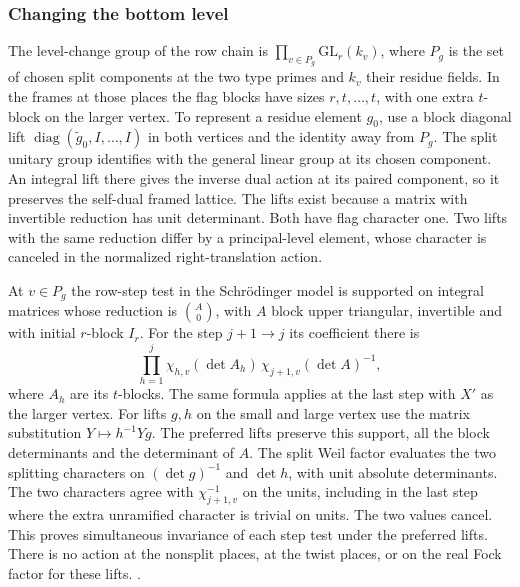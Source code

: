 \subsubsection{Changing the bottom level}
The level-change group of the row chain is
\(\prod_{v\in P_g}\mathrm{GL}_r(k_v)\), where \(P_g\) is the set of
chosen split components at the two type primes and \(k_v\) their
residue fields. In the frames at those places the flag blocks have
sizes \(r,t,\ldots,t\), with one extra \(t\)-block on the larger
vertex. To represent a residue element \(g_0\), use a block
diagonal lift \(\operatorname{diag}(\widetilde g_0,I,\ldots,I)\)
in both vertices and the identity away from \(P_g\). The split
unitary group identifies with the general linear group at its
chosen component. An integral lift there gives the inverse dual
action at its paired component, so it preserves the self-dual
framed lattice. The lifts exist because a matrix with invertible
reduction has unit determinant. Both have flag character one.
Two lifts with the same reduction differ by a principal-level
element, whose character is canceled in the normalized
right-translation action.

At \(v\in P_g\) the row-step test in the Schr\"odinger model is
supported on integral matrices whose reduction is \(\binom{A}{0}\),
with \(A\) block upper triangular, invertible and with initial
\(r\)-block \(I_r\). For the step \(j+1\to j\) its coefficient
there is
\[
   \prod_{h=1}^j\chi_{h,v}(\det A_h)\,
          \chi_{j+1,v}(\det A)^{-1},
\]
where \(A_h\) are its \(t\)-blocks. The same formula applies
at the last step with \(X'\) as the larger vertex. For lifts
\(g,h\) on the small and large vertex use the matrix substitution
\(Y\mapsto h^{-1}Yg\). The preferred lifts preserve this support,
all the block determinants and the determinant of \(A\). The
split Weil factor evaluates the two splitting characters on
\((\det g)^{-1}\) and \(\det h\), with unit absolute
determinants. The two characters agree with
\(\chi_{j+1,v}^{-1}\) on the units, including in the last step
where the extra unramified character is trivial on units.
The two values cancel. This proves simultaneous invariance of
each step test under the preferred lifts. There is no action
at the nonsplit places, at the twist places, or on the real
Fock factor for these lifts.
.

